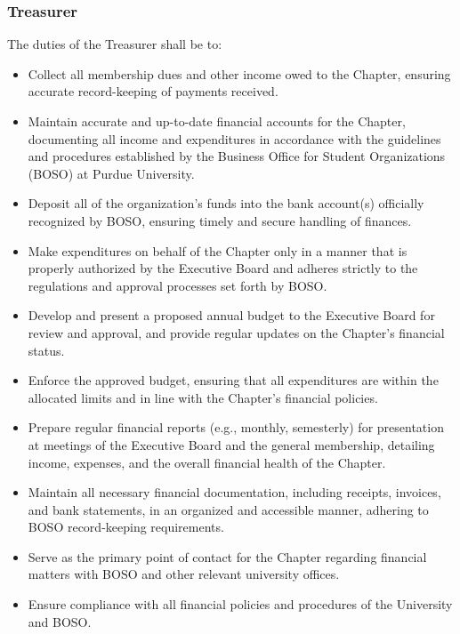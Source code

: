 \documentclass[10pt, oneside]{article}
\begin{document}
\subsubsection{Treasurer}
The duties of the Treasurer shall be to:
\begin{itemize}
    \item Collect all membership dues and other income owed to the Chapter, ensuring accurate record-keeping of payments received.
    \item Maintain accurate and up-to-date financial accounts for the Chapter, documenting all income and expenditures in accordance with the guidelines and procedures established by the Business Office for Student Organizations (BOSO) at Purdue University.
    \item Deposit all of the organization's funds into the bank account(s) officially recognized by BOSO, ensuring timely and secure handling of finances.
    \item Make expenditures on behalf of the Chapter only in a manner that is properly authorized by the Executive Board and adheres strictly to the regulations and approval processes set forth by BOSO.
    \item Develop and present a proposed annual budget to the Executive Board for review and approval, and provide regular updates on the Chapter's financial status.
    \item Enforce the approved budget, ensuring that all expenditures are within the allocated limits and in line with the Chapter's financial policies.
    \item Prepare regular financial reports (e.g., monthly, semesterly) for presentation at meetings of the Executive Board and the general membership, detailing income, expenses, and the overall financial health of the Chapter.
    \item Maintain all necessary financial documentation, including receipts, invoices, and bank statements, in an organized and accessible manner, adhering to BOSO record-keeping requirements.
    \item Serve as the primary point of contact for the Chapter regarding financial matters with BOSO and other relevant university offices.
    \item Ensure compliance with all financial policies and procedures of the University and BOSO.
\end{itemize}
\end{document}
